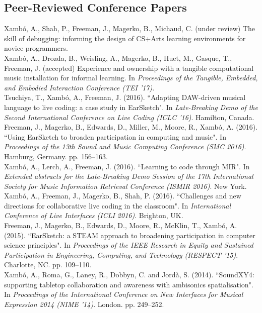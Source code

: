 \documentclass[10pt, a4paper]{article}
\newcommand{\years}[1]{\marginnote{\scriptsize #1}}
\begin{document}
\subsection*{Peer-Reviewed Conference Papers}
\noindent
\years{2016f}Xambó, A., Shah, P., Freeman, J., Magerko, B., Michaud, C. (under review) The skill of debugging: informing the design of CS+Arts learning environments for novice programmers.\\ 
\years{2016e}Xambó, A., Drozda, B., Weisling, A., Magerko, B., Huet, M., Gasque, T., Freeman, J. (accepted) Experience and ownership with a tangible computational music installation for informal learning. In \emph{Proceedings of the Tangible, Embedded, and Embodied Interaction Conference (TEI '17)}. \\ 
\years{2016d}Tsuchiya, T., Xambó, A., Freeman, J. (2016). “Adapting DAW-driven musical language to live coding: a case study in EarSketch". In \emph{Late-Breaking Demo of the Second International Conference on Live Coding (ICLC '16)}. Hamilton, Canada.\\ 
\years{2016c}Freeman, J., Magerko, B., Edwards, D., Miller, M., Moore, R., Xambó, A. (2016). “Using EarSketch to broaden participation in computing and music". In \emph{Proceedings of the 13th Sound and Music Computing Conference (SMC 2016)}. Hamburg, Germany. pp. 156--163.\\
\years{2016b}Xambó, A., Lerch, A., Freeman, J. (2016). “Learning to code through MIR". In \emph{Extended abstracts for the Late-Breaking Demo Session of the 17th International Society for Music Information Retrieval Conference (ISMIR 2016)}. New York.\\
\years{2016a}Xambó, A., Freeman, J., Magerko, B., Shah, P. (2016). “Challenges and new directions for collaborative live coding in the classroom". In \emph{International Conference of Live Interfaces (ICLI 2016)}. Brighton, UK.\\
\years{2015}Freeman, J., Magerko, B., Edwards, D., Moore, R., McKlin, T., Xambó, A. (2015). “EarSketch: a STEAM approach to broadening participation in computer science principles". In \emph{Proceedings of the IEEE Research in Equity and Sustained Participation in Engineering, Computing, and Technology (RESPECT '15)}. Charlotte, NC. pp. 109--110.\\
\years{2014b}Xambó, A., Roma, G., Laney, R., Dobbyn, C. and Jordà, S. (2014). “SoundXY4: supporting tabletop collaboration and awareness with ambisonics spatialisation". In \emph{Proceedings of the International Conference on New Interfaces for Musical Expression 2014 (NIME '14)}. London. pp. 249--252.\\
\end{document}

